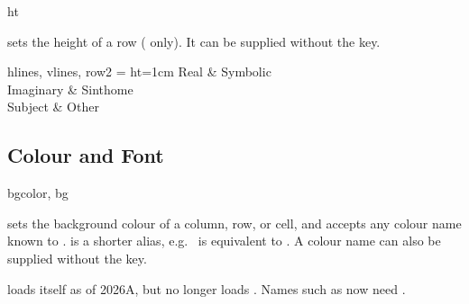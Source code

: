 \begin{codedescribe}[
    key,
    new=2021F,
    update=2021L
  ]{ht}
  \begin{codesyntax}
  \end{codesyntax}
   sets the height of a row ( only). It can be supplied without the key.

  \begin{codestore}[st=columns:ht]
    \begin{tblr}{
        hlines, vlines,
        row{2} = {ht=1cm}
      }
      Real      & Symbolic \\
      Imaginary & Sinthome \\
      Subject   & Other
    \end{tblr}\end{codestore}
  \begin{center}
  \end{center}
\end{codedescribe}

\subsection{Colour and Font}
\begin{codedescribe}[
    key,
    new=2021E,
    update=2021F,
    update=2021L,
    update=2026A
  ]{bgcolor, bg}
  \begin{codesyntax}
  \end{codesyntax}
   sets the background colour of a column, row, or cell, and accepts any colour name known to .  is a shorter alias, e.g.\  is equivalent to . A colour name can also be supplied without the key.
  \begin{tsremark}
     loads  itself as of 2026A, but no longer loads . Names such as  now need \tsverb*{\usepackage{ninecolors}}.
  \end{tsremark}
\end{codedescribe}

